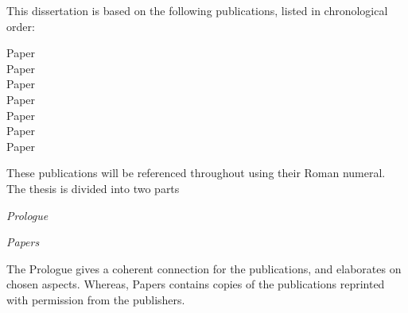 This dissertation is based on the following publications, listed in 
chronological order:
{\raggedright
\begin{description} 
    \item[Paper ] 
    \item[Paper ] 
    \item[Paper  ] 
    \item[Paper  ] 
    \item[Paper ] 
    \item[Paper ] 
    \item[Paper ] 
\end{description}}

\noindent These publications will be referenced throughout using their Roman 
numeral. 
The thesis is divided into two parts
\begin{enumerate*}[label={{}}]
    \item \emph{Prologue}
    \item \emph{Papers}
\end{enumerate*}
The Prologue gives a coherent connection for the publications, and 
elaborates on chosen aspects. Whereas, Papers contains copies of the 
publications reprinted with permission from the publishers.